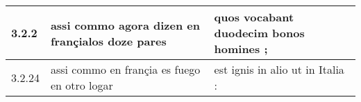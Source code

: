 \begin{tabular}{|p{1cm}|p{6.5cm}|p{6.5cm}|}

\hline
3.2.2 & assi commo agora dizen en françialos doze pares & quos vocabant duodecim bonos homines ; \\\hline
3.2.24 & assi commo en françia es fuego en otro logar & est ignis in alio ut in Italia : \\\hline

\end{tabular}
